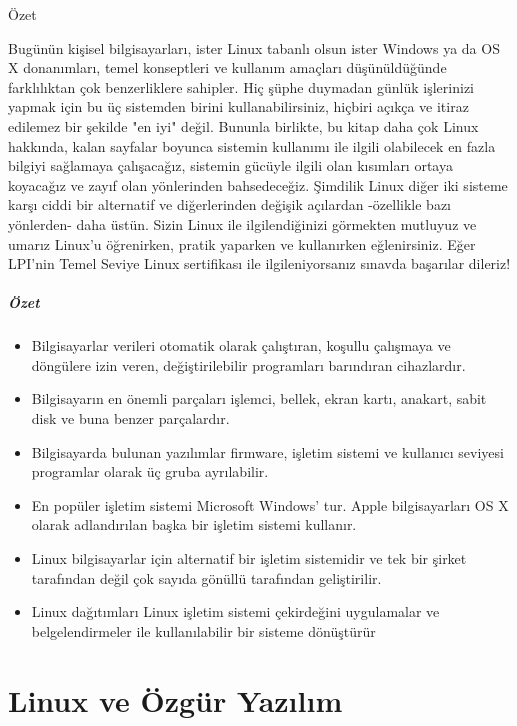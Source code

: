 \documentclass[10pt,a5paper]{book}
\begin{document}
\begin{section}{Özet}

Bugünün kişisel bilgisayarları, ister Linux tabanlı olsun ister Windows ya da OS X donanımları, temel konseptleri ve kullanım amaçları düşünüldüğünde farklılıktan çok benzerliklere sahipler. Hiç şüphe duymadan günlük işlerinizi yapmak için bu üç sistemden birini kullanabilirsiniz, hiçbiri açıkça ve itiraz edilemez bir şekilde "en iyi" değil. Bununla birlikte, bu kitap daha çok Linux hakkında, kalan sayfalar boyunca sistemin kullanımı ile ilgili olabilecek en fazla bilgiyi sağlamaya çalışacağız, sistemin gücüyle ilgili olan kısımları ortaya koyacağız ve zayıf olan yönlerinden bahsedeceğiz. Şimdilik Linux diğer iki sisteme karşı ciddi bir alternatif ve diğerlerinden değişik açılardan -özellikle bazı yönlerden- daha üstün. Sizin Linux ile ilgilendiğinizi görmekten mutluyuz ve umarız Linux'u öğrenirken, pratik yaparken ve kullanırken eğlenirsiniz. Eğer LPI'nin Temel Seviye Linux sertifikası ile ilgileniyorsanız sınavda başarılar dileriz!
\paragraph{Özet}{
\begin{itemize}
\item Bilgisayarlar verileri otomatik olarak çalıştıran, koşullu çalışmaya ve döngülere izin veren, değiştirilebilir programları barındıran cihazlardır.
\item Bilgisayarın en önemli parçaları işlemci, bellek, ekran kartı, anakart, sabit disk ve buna benzer parçalardır. 
\item Bilgisayarda bulunan yazılımlar firmware, işletim sistemi ve kullanıcı seviyesi programlar olarak üç gruba ayrılabilir. 
\item En popüler işletim sistemi Microsoft Windows' tur. Apple bilgisayarları OS X olarak adlandırılan başka bir işletim sistemi kullanır.
\item Linux bilgisayarlar için alternatif bir işletim sistemidir ve tek bir şirket tarafından değil çok sayıda gönüllü tarafından geliştirilir. 
\item Linux dağıtımları Linux işletim sistemi çekirdeğini uygulamalar ve belgelendirmeler ile kullanılabilir bir sisteme dönüştürür
\end{itemize}}
\end{section}


\chapter{Linux ve Özgür Yazılım}
\end{document}
